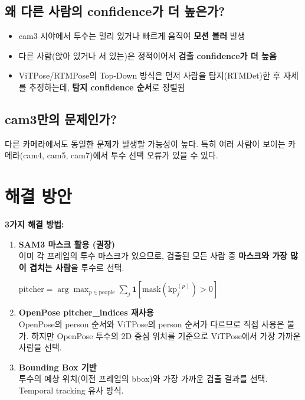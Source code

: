 \documentclass[11pt, a4paper]{article}
\begin{document}
\subsection{왜 다른 사람의 confidence가 더 높은가?}

\begin{itemize}[leftmargin=*]
  \item cam3 시야에서 투수는 멀리 있거나 빠르게 움직여 \textbf{모션 블러} 발생
  \item 다른 사람(앉아 있거나 서 있는)은 정적이어서 \textbf{검출 confidence가 더 높음}
  \item ViTPose/RTMPose의 Top-Down 방식은 먼저 사람을 탐지(RTMDet)한 후 자세를 추정하는데,
        \textbf{탐지 confidence 순서}로 정렬됨
\end{itemize}

\subsection{cam3만의 문제인가?}

다른 카메라에서도 동일한 문제가 발생할 가능성이 높다.
특히 여러 사람이 보이는 카메라(cam4, cam5, cam7)에서 투수 선택 오류가 있을 수 있다.


\section{해결 방안}

\begin{successbox}
\textbf{3가지 해결 방법:}

\begin{enumerate}[leftmargin=*]
  \item \textbf{SAM3 마스크 활용 (권장)}\\
    이미 각 프레임의 투수 마스크가 있으므로,
    검출된 모든 사람 중 \textbf{마스크와 가장 많이 겹치는 사람}을 투수로 선택.

    $\text{pitcher} = \arg\max_{p \in \text{people}} \sum_{j} \mathbf{1}[\text{mask}(\text{kp}_j^{(p)}) > 0]$

  \item \textbf{OpenPose pitcher\_indices 재사용}\\
    OpenPose의 person 순서와 ViTPose의 person 순서가 다르므로 직접 사용은 불가.
    하지만 OpenPose 투수의 2D 중심 위치를 기준으로 ViTPose에서 가장 가까운 사람을 선택.

  \item \textbf{Bounding Box 기반}\\
    투수의 예상 위치(이전 프레임의 bbox)와 가장 가까운 검출 결과를 선택.
    Temporal tracking 유사 방식.
\end{enumerate}
\end{successbox}
\end{document}
